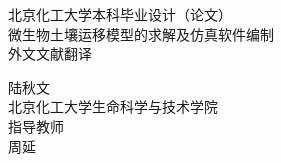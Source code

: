 \begin{titlepage}
\thispagestyle{empty}
\newcommand{\HRule}{\rule{\linewidth}{0.5mm}} %

\center %
 

\vspace*{1.2cm}
\textsc{ 北京化工大学本科毕业设计（论文）}\\[2.8cm] %


\vspace*{1.2cm}
{\heiti {}微生物土壤运移模型的求解及仿真软件编制 \biaosong{} \\ [0.8cm]外文文献翻译}\\[1cm] %
\vspace*{1.2cm}
 

{\kaishu\large
陆秋文\\
北京化工大学生命科学与技术学院\\[0.5cm]}
指导教师\\
{\large\kaishu 周\quad 延}


\end{titlepage}
